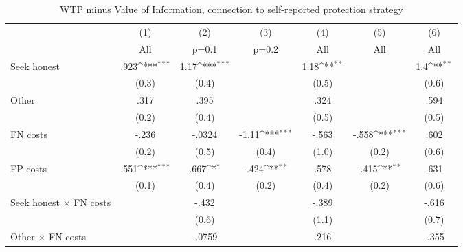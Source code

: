 \begin{table}[htbp]\centering
\def\sym#1{\ifmmode^{#1}\else\(^{#1}\)\fi}
\caption{WTP minus Value of Information, connection to self-reported protection strategy}
\begin{tabular}{l*{6}{c}}
\hline\hline
                &\multicolumn{1}{c}{(1)}&\multicolumn{1}{c}{(2)}&\multicolumn{1}{c}{(3)}&\multicolumn{1}{c}{(4)}&\multicolumn{1}{c}{(5)}&\multicolumn{1}{c}{(6)}\\
                &\multicolumn{1}{c}{All}&\multicolumn{1}{c}{p=0.1}&\multicolumn{1}{c}{p=0.2}&\multicolumn{1}{c}{All}&\multicolumn{1}{c}{All}&\multicolumn{1}{c}{All}\\
\hline
Seek honest     &     .923\sym{***}&     1.17\sym{***}&                  &     1.18\sym{**} &                  &      1.4\sym{**} \\
                &    (0.3)         &    (0.4)         &                  &    (0.5)         &                  &    (0.6)         \\
Other           &     .317         &     .395         &                  &     .324         &                  &     .594         \\
                &    (0.2)         &    (0.4)         &                  &    (0.5)         &                  &    (0.5)         \\
FN costs        &    -.236         &   -.0324         &    -1.11\sym{***}&    -.563         &    -.558\sym{***}&     .602         \\
                &    (0.2)         &    (0.5)         &    (0.4)         &    (1.0)         &    (0.2)         &    (0.6)         \\
FP costs        &     .551\sym{***}&     .667\sym{*}  &    -.424\sym{**} &     .578         &    -.415\sym{**} &     .631         \\
                &    (0.1)         &    (0.4)         &    (0.2)         &    (0.4)         &    (0.2)         &    (0.6)         \\
Seek honest $\times$ FN costs&                  &    -.432         &                  &    -.389         &                  &    -.616         \\
                &                  &    (0.6)         &                  &    (1.1)         &                  &    (0.7)         \\
Other $\times$ FN costs&                  &   -.0759         &                  &     .216         &                  &    -.355         \\

\end{tabular}
\end{table}
